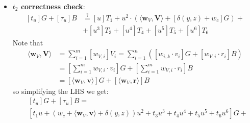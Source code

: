 \documentclass[../../book.tex]{subfiles}
\begin{document}
\begin{itemize}
\begin{equation*}
\begin{aligned}
            &- \langle \mathbf{y}^n, \mathbf{y}^{-n} \circ \mathbf{H} \rangle + \langle \mathbf{w}_O, \mathbf{y}^{-n} \circ \mathbf{H} \rangle + [\alpha u + \gamma u^2 + \beta u^3]B \\
            &= \textcolor{Violet}{u^3 \cdot \langle \mathbf{s}_L, \mathbf{G} \rangle} + \textcolor{teal}{u^2 \cdot \langle \mathbf{a}_O, \mathbf{G} \rangle} + \textcolor{Sepia}{u \cdot \langle \mathbf{a}_L, \mathbf{G}\rangle + u \cdot \langle \mathbf{y}^{-n} \circ \mathbf{w}_R, \mathbf{G} \rangle} + \\
            &+\textcolor{Violet}{u^3 \cdot \langle \mathbf{s}_R, \mathbf{H} \rangle} + \textcolor{Sepia}{u \cdot \langle \mathbf{a}_R, \mathbf{H} \rangle + u \cdot \langle \mathbf{w}_L, \mathbf{y}^n \circ \mathbf{H} \rangle} \\
            &\textcolor{gray}{- \langle \mathbf{1}^n, \mathbf{H} \rangle + \langle \mathbf{w}_O, \mathbf{y}^{-n} \circ \mathbf{H} \rangle} + \textcolor{RubineRed}{[\alpha u]B + [\gamma u^2]B + [\beta u^3]B}
        \end{aligned}
    \end{equation*}
    As we see, $LHS=RHS$, so the check holds.
    \item \textbf{$t_2$ correctness check}:
    \begin{equation*}
        \begin{aligned}
            [t_u]G + [\tau_u]B &\stackrel{\text{?}}{=} [u]T_1 + u^2 \cdot (\langle \mathbf{w}_V, \mathbf{V} \rangle + [\delta(y,z) + w_c]G) +\\
            &+ [u^3]T_3 + [u^4]T_4 + [u^5]T_5 + [u^6]T_6
        \end{aligned}
    \end{equation*}
    Note that 
    \begin{align*}
        \langle \mathbf{w}_V, \mathbf{V} \rangle &= \sum_{i=1}^m [w_{V,i}]V_i = \sum_{i=1}^n ([w_{i, k} \cdot v_i]G + [w_{V, i} \cdot r_i]B) \\
        &= [\sum_{i=1}^m w_{V, i} \cdot v_i]G + [\sum_{i=1}^m w_{V, i} \cdot r_i]B \\
        &= [\langle \mathbf{w}_V, \mathbf{v} \rangle] G + [\langle \mathbf{w}_V, \mathbf{r} \rangle] B
    \end{align*}
    so simplifying the LHS we get:
    \begin{equation*}
        \begin{aligned}
            &[t_u]G + [\tau_u]B = \\
            & [t_1 u + (w_c + \langle \mathbf{w}_V, \mathbf{v} \rangle + \delta(y, z)) u^2 + t_3 u^3 + t_4 u^4 + t_5 u^5 + t_6 u^6]G + \\

\end{aligned}
\end{equation*}
\end{itemize}
\end{document}
